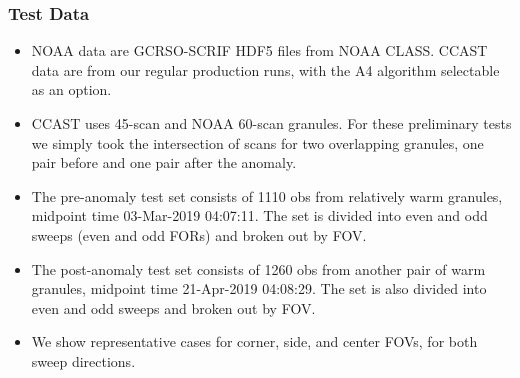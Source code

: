 \documentclass[10pt]{beamer}
\begin{document}
\begin{frame}
\frametitle{Test Data}
\begin{itemize}

\item NOAA data are GCRSO-SCRIF HDF5 files from NOAA CLASS.  CCAST
  data are from our regular production runs, with the A4 algorithm
  selectable as an option.

  \item CCAST uses 45-scan and NOAA 60-scan granules.  For these
    preliminary tests we simply took the intersection of scans for
    two overlapping granules, one pair before and one pair after the
    anomaly.

  \item The pre-anomaly test set consists of 1110 obs from
    relatively warm granules, midpoint time 03-Mar-2019 04:07:11.
    The set is divided into even and odd sweeps (even and odd FORs)
    and broken out by FOV.

  \item The post-anomaly test set consists of 1260 obs from another
    pair of warm granules, midpoint time 21-Apr-2019 04:08:29.  The
    set is also divided into even and odd sweeps and broken out by
    FOV.

  \item We show representative cases for corner, side, and center
    FOVs, for both sweep directions.

\end{itemize}
\end{frame}
\end{document}
